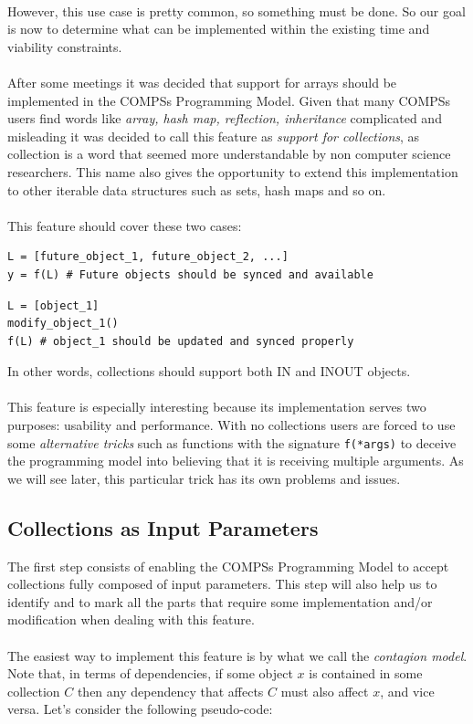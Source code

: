 \\
However, this use case is pretty common, so something must be done. So our goal is now to determine what can be implemented within the existing time and viability constraints.\\
\\
After some meetings it was decided that support for arrays should be implemented in the COMPSs Programming Model. Given that many COMPSs users find words like \textit{array, hash map, reflection, inheritance} complicated and misleading it was decided to call this feature as \textit{support for collections}, as collection is a word that seemed more understandable by non computer science researchers. This name also gives the opportunity to extend this implementation to other iterable data structures such as sets, hash maps and so on.\\
\\
This feature should cover these two cases:
\begin{verbatim}
L = [future_object_1, future_object_2, ...]
y = f(L) # Future objects should be synced and available
\end{verbatim}

\begin{verbatim}
L = [object_1]
modify_object_1()
f(L) # object_1 should be updated and synced properly
\end{verbatim}
In other words, collections should support both IN and INOUT objects.\\
\\
This feature is especially interesting because its implementation serves two purposes: usability and performance. With no collections users are forced to use some \textit{alternative tricks} such as functions with the signature \verb|f(*args)| to deceive the programming model into believing that it is receiving multiple arguments. As we will see later, this particular trick has its own problems and issues.

\subsection{Collections as Input Parameters}
\label{subsec:col_in}
The first step consists of enabling the COMPSs Programming Model to accept collections fully composed of input parameters. This step will also help us to identify and to mark all the parts that require some implementation and/or modification when dealing with this feature.\\
\\
The easiest way to implement this feature is by what we call the \textit{contagion model}. Note that, in terms of dependencies, if some object $x$ is contained in some collection $C$ then any dependency that affects $C$ must also affect $x$, and vice versa. Let's consider the following pseudo-code:

